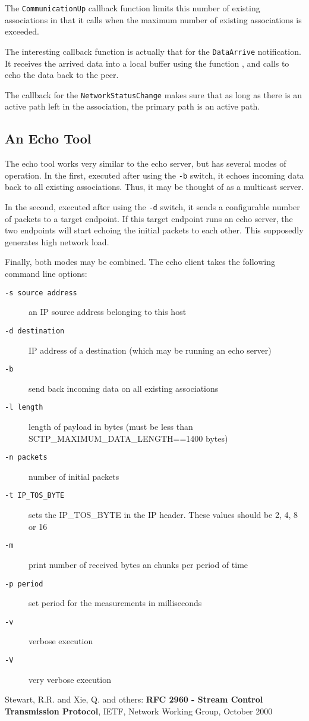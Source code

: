 \documentclass[10pt]{article}
\newcommand{\pp}{\vspace{0,5cm} \noindent }
\begin{document}
\pp
The \texttt{CommunicationUp} callback function limits this number of
existing associations in that it calls  when the
maximum number of existing associations is exceeded.

The interesting callback function is actually that for the \texttt{DataArrive}
notification. It receives the arrived data into a local buffer using the function
, and calls  to echo the data
back to the peer.

The callback for the \texttt{NetworkStatusChange} makes sure that as long as there
is an active path left in the association, the primary path is an active
path.

\subsection{An Echo Tool}
\label{echo2}
The echo tool works very  similar to the echo server, but has several modes
of operation. In the first, executed after using the \texttt{-b} switch, it
echoes incoming data back to all existing associations. 
Thus, it may be thought of as a multicast server.

In the second, executed after using the \texttt{-d} switch, it sends 
a configurable number of packets to a target endpoint. If this target
endpoint runs an echo server, the two endpoints will start echoing the
initial packets to each other. This supposedly generates high network load.

Finally, both modes may be combined.
The echo client takes the following command line options:
\begin{description}
\item[\texttt{-s source address}] an IP source address belonging to this host
\item[\texttt{-d destination}] IP address of a destination (which may be
    running an echo server)
\item[\texttt{-b}] send back incoming data on all existing associations
\item[\texttt{-l length}] length of payload in bytes (must be less than
    SCTP_MAXIMUM_DATA_LENGTH==1400 bytes)
\item[\texttt{-n packets}] number of initial packets
\item[\texttt{-t IP_TOS_BYTE}] sets the IP_TOS_BYTE in the IP header. These values
    should be 2, 4, 8 or 16
\item[\texttt{-m}] print number of received bytes an chunks per period of time
\item[\texttt{-p period}] set period for the measurements in milliseconds
\item[\texttt{-v}] verbose execution
\item[\texttt{-V}] very verbose execution
\end{description}

\begin{thebibliography}{9}

 Stewart, R.R. and  Xie, Q. and others:
\textbf{RFC 2960 - Stream Control Transmission Protocol},
IETF, Network Working Group, October 2000

\end{thebibliography}
\end{document}
